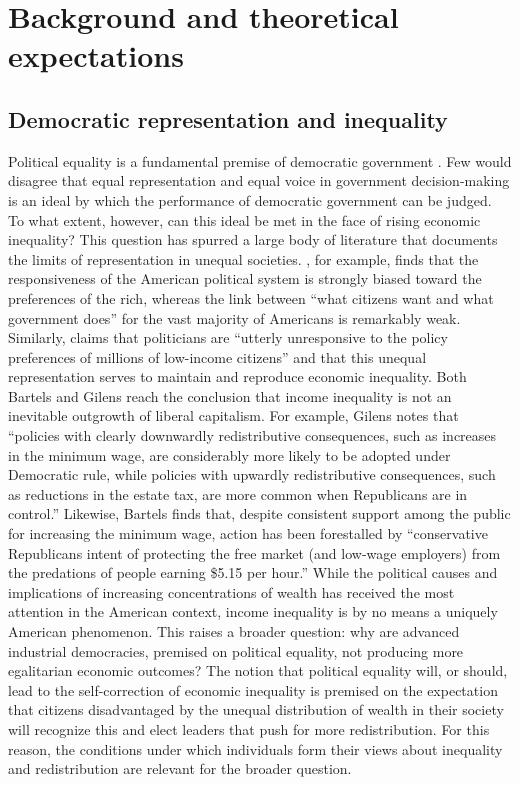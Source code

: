 \documentclass[12pt, letter]{scrartcl}
\begin{document}
\section{Background and theoretical expectations}
\vspace{-10pt}
\singlespacing
\subsection{Democratic representation and inequality}
\doublespacing
Political equality is a fundamental premise of democratic government \parencite{dahl1971polyarchy}. Few would disagree that equal representation and equal voice in government decision-making is an ideal by which the performance of democratic government can be judged. To what extent, however, can this ideal be met in the face of rising economic inequality? This question has spurred a large body of literature that documents the limits of representation in unequal societies. \textcite{gilens2012affluence}, for example, finds that the responsiveness of the American political system is strongly biased toward the preferences of the rich, whereas the link between ``what citizens want and what government does'' for the vast majority of Americans is remarkably weak. Similarly, \textcite{bartels2008unequal} claims that politicians are ``utterly unresponsive to the policy preferences of millions of low-income citizens'' and that this unequal representation serves to maintain and reproduce economic inequality. Both Bartels and Gilens reach the conclusion that income inequality is not an inevitable outgrowth of liberal capitalism. For example, Gilens notes that ``policies with clearly downwardly redistributive consequences, such as increases in the minimum wage, are considerably more likely to be adopted under Democratic rule, while policies with upwardly redistributive consequences, such as reductions in the estate tax, are more common when Republicans are in control.'' Likewise, Bartels finds that, despite consistent support among the public for increasing the minimum wage, action has been forestalled by ``conservative Republicans intent of protecting the free market (and low-wage employers) from the predations of people earning \$5.15 per hour.” While the political causes and implications of increasing concentrations of wealth has received the most attention in the American context, income inequality is by no means a uniquely American phenomenon. This raises a broader question: why are advanced industrial democracies, premised on political equality, not producing more egalitarian economic outcomes? The notion that political equality will, or should, lead to the self-correction of economic inequality is premised on the expectation that citizens disadvantaged by the unequal distribution of wealth in their society will recognize this and elect leaders that push for more redistribution. For this reason, the conditions under which individuals form their views about inequality and redistribution are relevant for the broader question.
\end{document}
